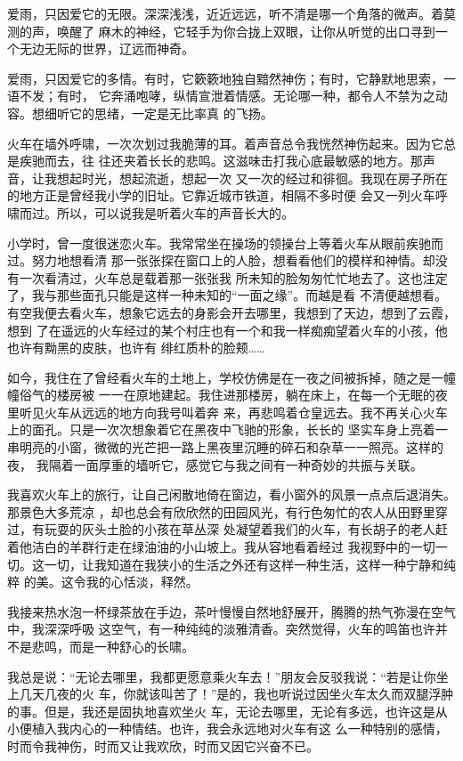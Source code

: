\documentclass[12pt,a4paper]{article}
\begin{document}
		爱雨，只因爱它的无限。深深浅浅，近近远远，听不清是哪一个角落的微声。着莫测的声，唤醒了
	麻木的神经，它轻手为你合拢上双眼，让你从听觉的出口寻到一个无边无际的世界，辽远而神奇。

		爱雨，只因爱它的多情。有时，它簌簌地独自黯然神伤；有时，它静默地思索，一语不发；有时，
	它奔涌咆哮，纵情宣泄着情感。无论哪一种，都令人不禁为之动容。想细听它的思绪，一定是无比率真
	的飞扬。

	\endwriting



		火车在墙外呼啸，一次次划过我脆薄的耳。着声音总令我恍然神伤起来。因为它总是疾驰而去，往
	往还夹着长长的悲鸣。这滋味击打我心底最敏感的地方。那声音，让我想起时光，想起流逝，想起一次
	又一次的经过和徘徊。我现在房子所在的地方正是曾经我小学的旧址。它靠近城市铁道，相隔不多时便
	会又一列火车呼啸而过。所以，可以说我是听着火车的声音长大的。

		小学时，曾一度很迷恋火车。我常常坐在操场的领操台上等着火车从眼前疾驰而过。努力地想看清
	那一张张探在窗口上的人脸，想看看他们的模样和神情。却没有一次看清过，火车总是载着那一张张我
	所未知的脸匆匆忙忙地去了。这也注定了，我与那些面孔只能是这样一种未知的“一面之缘”。而越是看
	不清便越想看。有空我便去看火车，想象它远去的身影会开去哪里，我想到了天边，想到了云霞，想到
	了在遥远的火车经过的某个村庄也有一个和我一样痴痴望着火车的小孩，他也许有黝黑的皮肤，也许有
	绯红质朴的脸颊……

		如今，我住在了曾经看火车的土地上，学校仿佛是在一夜之间被拆掉，随之是一幢幢俗气的楼房被
	一一在原地建起。我住进那楼房，躺在床上，在每一个无眠的夜里听见火车从远远的地方向我号叫着奔
	来，再悲鸣着仓皇远去。我不再关心火车上的面孔。只是一次次想象着它在黑夜中飞驰的形象，长长的
	坚实车身上亮着一串明亮的小窗，微微的光芒把一路上黑夜里沉睡的碎石和杂草一一照亮。这样的夜，
	我隔着一面厚重的墙听它，感觉它与我之间有一种奇妙的共振与关联。

		我喜欢火车上的旅行，让自己闲散地倚在窗边，看小窗外的风景一点点后退消失。那景色大多荒凉
	，却也总会有欣欣然的田园风光，有行色匆忙的农人从田野里穿过，有玩耍的灰头土脸的小孩在草丛深
	处凝望着我们的火车，有长胡子的老人赶着他洁白的羊群行走在绿油油的小山坡上。我从容地看着经过
	我视野中的一切一切。这一切，让我知道在我狭小的生活之外还有这样一种生活，这样一种宁静和纯粹
	的美。这令我的心恬淡，释然。

		我接来热水泡一杯绿茶放在手边，茶叶慢慢自然地舒展开，腾腾的热气弥漫在空气中，我深深呼吸
	这空气，有一种纯纯的淡雅清香。突然觉得，火车的鸣笛也许并不是悲鸣，而是一种舒心的长啸。

		我总是说：“无论去哪里，我都更愿意乘火车去！”朋友会反驳我说：“若是让你坐上几天几夜的火
	车，你就该叫苦了！”是的，我也听说过因坐火车太久而双腿浮肿的事。但是，我还是固执地喜欢坐火
	车，无论去哪里，无论有多远，也许这是从小便植入我内心的一种情结。也许，我会永远地对火车有这
	么一种特别的感情，时而令我神伤，时而又让我欢欣，时而又因它兴奋不已。
\end{document}
